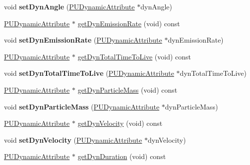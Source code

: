 \begin{DoxyCompactItemize}
\item 
\mbox{\label{classPUEmitter_a4f30f5b8ad670ff7087d5c8693e94cf0}} 
void {\bfseries set\+Dyn\+Angle} (\hyperlink{classPUDynamicAttribute}{P\+U\+Dynamic\+Attribute} $\ast$dyn\+Angle)
\item 
\hyperlink{classPUDynamicAttribute}{P\+U\+Dynamic\+Attribute} $\ast$ \hyperlink{classPUEmitter_a2e7613f45571f856daa10102610dda3f}{get\+Dyn\+Emission\+Rate} (void) const
\item 
\mbox{\label{classPUEmitter_ab6ad83450f676771b3b60f21c3883e43}} 
void {\bfseries set\+Dyn\+Emission\+Rate} (\hyperlink{classPUDynamicAttribute}{P\+U\+Dynamic\+Attribute} $\ast$dyn\+Emission\+Rate)
\item 
\hyperlink{classPUDynamicAttribute}{P\+U\+Dynamic\+Attribute} $\ast$ \hyperlink{classPUEmitter_ad10d6d8ab7e59b17f3baec994304a58e}{get\+Dyn\+Total\+Time\+To\+Live} (void) const
\item 
\mbox{\label{classPUEmitter_af05805e991a246714dbbe7952bde709d}} 
void {\bfseries set\+Dyn\+Total\+Time\+To\+Live} (\hyperlink{classPUDynamicAttribute}{P\+U\+Dynamic\+Attribute} $\ast$dyn\+Total\+Time\+To\+Live)
\item 
\hyperlink{classPUDynamicAttribute}{P\+U\+Dynamic\+Attribute} $\ast$ \hyperlink{classPUEmitter_a9c80a35323f067e941f51e5dd1d0bb31}{get\+Dyn\+Particle\+Mass} (void) const
\item 
\mbox{\label{classPUEmitter_a7bf6c32faf96c75508faa4e94ba8dc62}} 
void {\bfseries set\+Dyn\+Particle\+Mass} (\hyperlink{classPUDynamicAttribute}{P\+U\+Dynamic\+Attribute} $\ast$dyn\+Particle\+Mass)
\item 
\hyperlink{classPUDynamicAttribute}{P\+U\+Dynamic\+Attribute} $\ast$ \hyperlink{classPUEmitter_a0515b992a0d4ce765ccd8a58d95edf27}{get\+Dyn\+Velocity} (void) const
\item 
\mbox{\label{classPUEmitter_a68a3f8e9d491aa0468d6a2faba143329}} 
void {\bfseries set\+Dyn\+Velocity} (\hyperlink{classPUDynamicAttribute}{P\+U\+Dynamic\+Attribute} $\ast$dyn\+Velocity)
\item 
\hyperlink{classPUDynamicAttribute}{P\+U\+Dynamic\+Attribute} $\ast$ \hyperlink{classPUEmitter_ab6ee381061b237e314ca9d7b756cd81b}{get\+Dyn\+Duration} (void) const
\item 

\end{DoxyCompactItemize}
